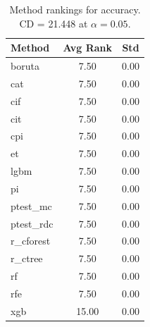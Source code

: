 \begin{table}[h]
\centering
\caption{Method rankings for accuracy. CD = 21.448 at $\alpha=0.05$.}
\label{tab:ranks_accuracy}
\begin{tabular}{lcc}
\toprule
Method & Avg Rank & Std \\
\midrule
boruta & 7.50 & 0.00 \\
cat & 7.50 & 0.00 \\
cif & 7.50 & 0.00 \\
cit & 7.50 & 0.00 \\
cpi & 7.50 & 0.00 \\
et & 7.50 & 0.00 \\
lgbm & 7.50 & 0.00 \\
pi & 7.50 & 0.00 \\
ptest_mc & 7.50 & 0.00 \\
ptest_rdc & 7.50 & 0.00 \\
r_cforest & 7.50 & 0.00 \\
r_ctree & 7.50 & 0.00 \\
rf & 7.50 & 0.00 \\
rfe & 7.50 & 0.00 \\
xgb & 15.00 & 0.00 \\
\bottomrule
\end{tabular}
\end{table}